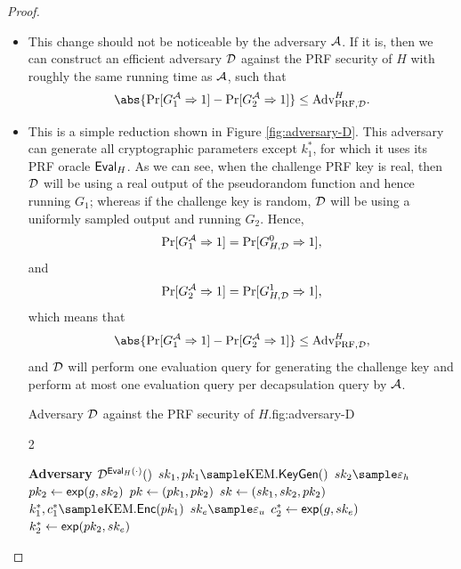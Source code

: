 \begin{proof}
\begin{itemize}
    \item[\emph{Claim 2}]
        This change should not be noticeable by the adversary
        $\mathcal{A}$.
        If it is, then we can construct an efficient adversary
        $\mathcal{D}$ against the PRF security of $H$ with roughly the same
        running time as $\mathcal{A}$, such that
        \[
            \abs{\prone{G^{\adversary{A}}_1} - \prone{G^{\adversary{A}}_2}} \leq \advantage{\prf, \adversary{D}}{H}.
        \]
    \item[\emph{Proof}]
        This is a simple reduction shown in Figure \ref{fig:adversary-D}.
        This adversary can generate all cryptographic parameters except
        $k_1^*$, for which it uses its PRF oracle $\textsf{Eval}_H$.
        As we can see, when the challenge PRF key is real, then
        $\mathcal{D}$ will be using a real output of the pseudorandom
        function and hence running $G_1$; whereas if the challenge key is
        random, $\mathcal{D}$ will be using a uniformly sampled output and
        running $G_2$.
        Hence,
        \[
            \Pr[G^{\mathcal{A}}_1 \Rightarrow 1] = \Pr[G_{H, \mathcal{D}}^{0} \Rightarrow 1],
        \]
        and
        \[
            \Pr[G^{\mathcal{A}}_2 \Rightarrow 1] = \Pr[G_{H, \mathcal{D}}^{1} \Rightarrow 1],
        \]
        which means that
        \[
            \abs{\prone{G^{\adversary{A}}_1} - \prone{G^{\adversary{A}}_2}} \leq \advantage{\prf, \adversary{D}}{H},
        \]
        and $\mathcal{D}$ will perform one evaluation query for generating
        the challenge key and perform at most one evaluation query per
        decapsulation query by $\mathcal{A}$.
        \begin{gamefigure}{Adversary $\mathcal{D}$ against the PRF security of $H$.}{fig:adversary-D}
            \begin{games}{2}
                \begin{gameenv}{\textbf{Adversary} $\mathcal{D}^{\textsf{Eval}_H(\cdot)}()$}
                    \State $\sk_1, \pk_1 \sample \kem.\keygen()$
                    \State $\sk_2 \sample \honestexponent$
                    \State $pk_2 \leftarrow \textsf{exp}(g, sk_2)$
                    \State $pk \leftarrow (pk_1, pk_2)$
                    \State $sk \leftarrow (sk_1, sk_2, pk_2)$
                    \State $k^*_1, c^*_1 \sample \kem.\enc(\pk_1)$
                    \State $\sk_e \sample \exponent$
                    \State $c^*_2 \leftarrow \textsf{exp}(g, sk_e)$
                    \State $k^*_2 \leftarrow \textsf{exp}(pk_2, sk_e)$

\end{gameenv}
\end{games}
\end{gamefigure}
\end{itemize}
\end{proof}
